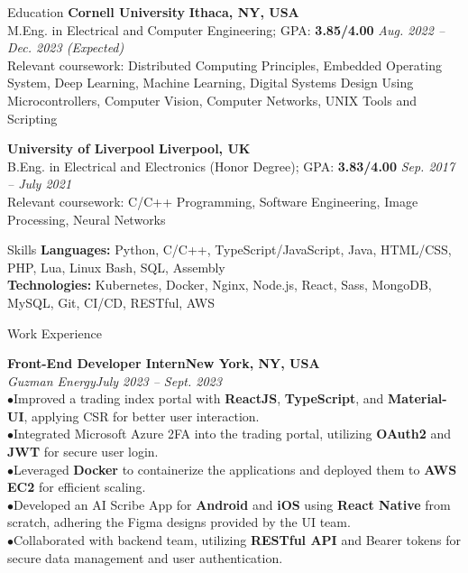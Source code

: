 \documentclass{resume} %
\begin{document}
\begin{rSection}{Education}
{\textbf{Cornell University}} \hfill{\textbf{Ithaca, NY, USA}}
\\ M.Eng. in Electrical and Computer Engineering; GPA: \textbf{3.85/4.00} \hfill{\em Aug. 2022 -- Dec. 2023 (Expected)}
\\ Relevant coursework: Distributed Computing Principles, Embedded Operating System, Deep Learning, Machine Learning, Digital Systems Design Using Microcontrollers, Computer Vision, Computer Networks, UNIX Tools and Scripting

{\textbf{University of Liverpool}} \hfill{\textbf{Liverpool, UK}}
\\ B.Eng. in Electrical and Electronics (Honor Degree); GPA: \textbf{3.83/4.00} \hfill{\em Sep. 2017 -- July 2021}
\\ Relevant coursework: C/C++ Programming, Software Engineering, Image Processing, Neural Networks
\end{rSection}

\begin{rSection}{Skills}
{\textbf{Languages:}} Python, C/C++, TypeScript/JavaScript, Java, HTML/CSS, PHP, Lua, Linux Bash, SQL, Assembly
\\{\textbf{Technologies:}} Kubernetes, Docker, Nginx, Node.js, React, Sass, MongoDB, MySQL, Git, CI/CD, RESTful, AWS


\end{rSection}

\begin{rSection}{Work Experience}

{\bf Front-End Developer Intern}\hfill{\textbf{New York, NY, USA}}
\\{\em Guzman Energy}\hfill {\em July 2023 -- Sept. 2023}
\\ $ \bullet $Improved a trading index portal with \textbf{ReactJS}, \textbf{TypeScript}, and \textbf{Material-UI}, applying CSR for better user interaction.
\\ $ \bullet $Integrated Microsoft Azure 2FA into the trading portal, utilizing \textbf{OAuth2} and \textbf{JWT} for secure user login.
\\ $ \bullet $Leveraged \textbf{Docker} to containerize the applications and deployed them to \textbf{AWS EC2} for efficient scaling.
\\ $ \bullet $Developed an AI Scribe App for \textbf{Android} and \textbf{iOS} using \textbf{React Native} from scratch, adhering the Figma designs provided by the UI team.
\\ $ \bullet $Collaborated with backend team, utilizing \textbf{RESTful API} and Bearer tokens for secure data management and user authentication.


\end{rSection}
\end{document}
